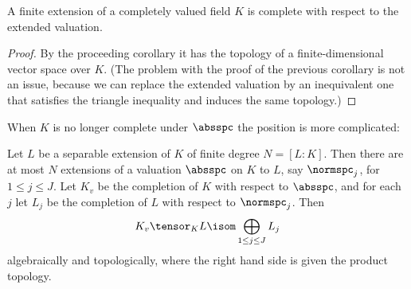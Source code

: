 \begin{corollary}\label{cor:iscomp}
A finite extension of a completely valued field $K$ is complete
with respect to the extended valuation.
\end{corollary}
\begin{proof}
By the proceeding corollary it has the topology of a finite-dimensional
vector space over $K$. (The problem with the proof of the previous
corollary is not an issue, because we can replace the extended valuation
by an inequivalent one that satisfies the triangle inequality and
induces the same topology.)
\end{proof}

When $K$ is no longer complete under $\absspc$ the position is more complicated:
\begin{theorem}\label{thm:extensions}
Let $L$ be a separable extension of $K$ of finite degree
  $N=[L:K]$.  Then there are at most $N$ extensions of a valuation
  $\absspc$ on $K$ to $L$, say $\normspc_j$, for $1\leq j \leq J$.
  Let $K_v$ be the completion of $K$ with respect to $\absspc$, and for
  each~$j$ let $L_j$ be the completion of $L$ with respect to
  $\normspc_j$.  Then
\begin{equation}\label{eqn:tenslocal}
  K_v \tensor_K L \isom \bigoplus_{1\leq j\leq J} L_j
\end{equation}
algebraically and topologically, where the right hand side is given
the product topology.
\end{theorem}
